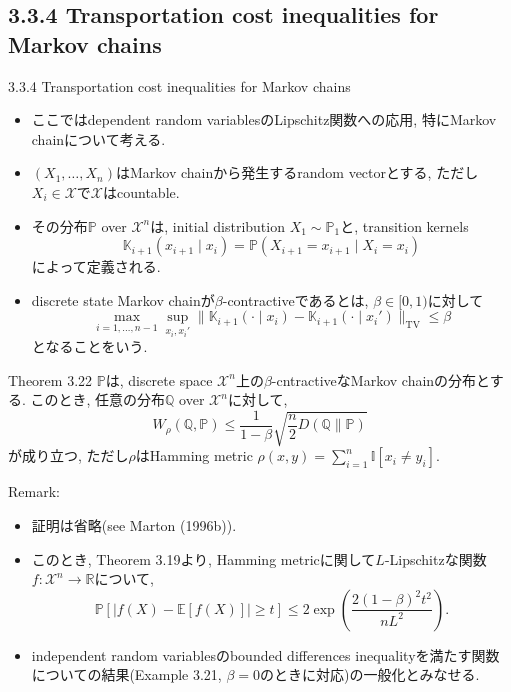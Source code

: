 \documentclass[aspectratio=169, dvipdfmx]{beamer}
\newcommand{\ex}{\mathbb{E}}
\newcommand{\bb}{\mathbb}
\newcommand{\cc}{\mathcal}
\begin{document}
\subsection{3.3.4 Transportation cost inequalities for Markov chains}
\begin{frame}{3.3.4 Transportation cost inequalities for Markov chains}
    \begin{itemize}
        \item ここではdependent random variablesのLipschitz関数への応用,
        特にMarkov chainについて考える.
        \item $(X_1, \dots, X_n)$はMarkov chainから発生するrandom vectorとする, ただし$X_i \in \cc{X}$で$\cc{X}$はcountable.
        \item その分布$\bb{P}$ over $\cc{X}^n$は, initial distribution $X_1 \sim \bb{P}_1$と, transition kernels
        \[
            \bb{K}_{i+1}(x_{i+1} \mid x_i) = \bb{P}(X_{i+1} = x_{i+1} \mid X_i = x_i)
            \tag{3.66}\label{3.66}
        \]
        によって定義される.
        \item discrete state Markov chainが$\beta$-contractiveであるとは, $\beta \in [0, 1)$に対して
        \[
            \max_{i = 1,\dots, n-1} \sup_{x_i, x_i'} \| \bb{K}_{i+1}(\cdot\mid x_i) - \bb{K}_{i+1}(\cdot\mid x_i') \|_{\mathrm{TV}}
            \le \beta
            \tag{3.67}\label{3.67}
        \]
        となることをいう.
    \end{itemize}
\end{frame}

\begin{frame}{}{}
\begin{block}{Theorem 3.22}
    $\bb{P}$は, discrete space $\cc{X}^n$上の$\beta$-cntractiveなMarkov chainの分布とする.
    このとき, 任意の分布$\bb{Q}$ over $\cc{X}^n$に対して,
    \[
        W_\rho(\bb{Q}, \bb{P}) \le \frac{1}{1-\beta}\sqrt{\frac{n}{2}D(\bb{Q} \| \bb{P})}
        \tag{3.68}\label{3.68}
    \]
    が成り立つ, ただし$\rho$はHamming metric $\rho(x, y) = \sum_{i=1}^n \bb{I}[x_i \ne y_i]$.
\end{block}
{Remark:}
\begin{itemize}
    \item 証明は省略(see Marton (1996b)).
    \item このとき, Theorem 3.19より, Hamming metricに関して$L$-Lipschitzな関数$f:\cc{X}^n \to \bb{R}$について, 
    \[
        \bb{P}\left[|f(X)-\ex[f(X)]| \ge t\right]
        \le 2 \exp\left(\frac{2(1-\beta)^2 t^2}{nL^2}\right).
        \tag{3.69}\label{3.69}
    \]
    \item independent random variablesのbounded differences inequalityを満たす関数についての結果(Example 3.21, $\beta = 0$のときに対応)の一般化とみなせる.
\end{itemize}
\end{frame}
\end{document}
